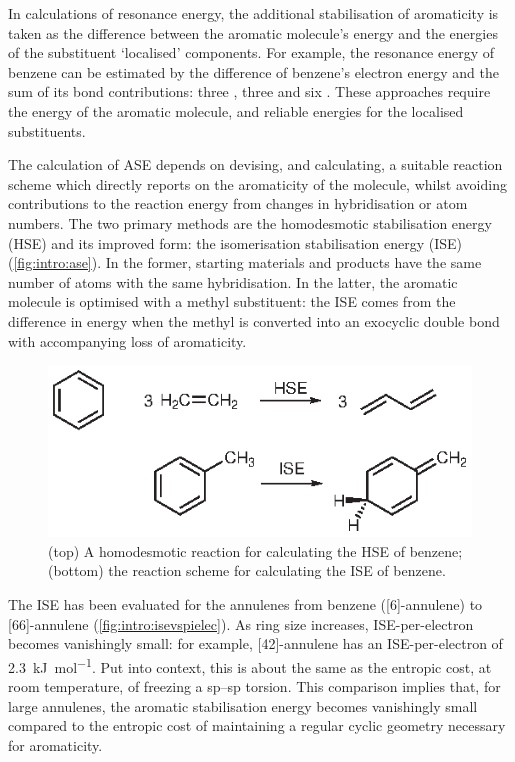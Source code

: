 			In calculations of resonance energy, the additional stabilisation of aromaticity is taken as the difference between the aromatic molecule's energy and the energies of the substituent `localised' components. For example, the resonance energy of benzene can be estimated by the difference of benzene's electron energy and the sum of its bond contributions: three , three  and six . These approaches require the energy of the aromatic molecule, and reliable energies for the localised substituents.

			The calculation of ASE depends on devising, and calculating, a suitable reaction scheme which directly reports on the aromaticity of the molecule, whilst avoiding contributions to the reaction energy from changes in hybridisation or atom numbers. The two primary methods are the homodesmotic stabilisation energy (HSE) and its improved form: the isomerisation stabilisation energy (ISE) (\autoref{fig:intro:ase}).\autocite{Schleyer2002} In the former, starting materials and products have the same number of atoms with the same hybridisation. In the latter, the aromatic molecule is optimised with a methyl substituent: the ISE comes from the difference in energy when the methyl is converted into an exocyclic double bond with accompanying loss of aromaticity.

			\begin{figure}[ht!]
				\centering\includegraphics{figures/intro/ase.eps} 
				\caption[]{(top) A homodesmotic reaction for calculating the HSE of benzene; (bottom) the reaction scheme for calculating the ISE of benzene.}
				\label{fig:intro:ase}
			\end{figure}


			The ISE has been evaluated for the annulenes from benzene ([6]-annulene) to [66]-annulene (\autoref{fig:intro:isevspielec}).\autocite{Wannere2003} As ring size increases, ISE-per-electron becomes vanishingly small: for example, [42]-annulene has an ISE-per-electron of \SI{2.3}{\kilo\joule\per\mole}. Put into context, this is about the same as the entropic cost, at room temperature, of freezing a sp\tsup2--sp torsion.\autocite{Mammen1998} This comparison implies that, for large annulenes, the aromatic stabilisation energy becomes vanishingly small compared to the entropic cost of maintaining a regular cyclic geometry necessary for aromaticity.

